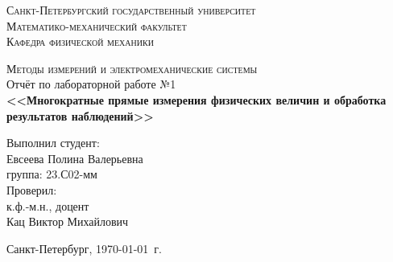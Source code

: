 \begin{titlepage}
\begin{center}
\textsc{Санкт-Петербургский государственный университет\\
Математико-механический факультет\\
Кафедра физической механики\\}

\vfill

\textsc{Методы измерений и электромеханические системы\\[3mm]}
Отчёт по лабораторной работе №1\\[6mm]


\textbf{\large<<Многократные прямые измерения физических величин и обработка результатов наблюдений>>}

\vfill
\end{center}

\hfill
\begin{minipage}{.5\textwidth}
Выполнил студент:\\[2mm] 
Евсеева Полина Валерьевна\\
группа: 23.С02-мм\\[5mm]

Проверил:\\[2mm] 
к.ф.-м.н., доцент\\
Кац Виктор Михайлович
\end{minipage}%
\vfill
\begin{center}
 Санкт-Петербург, \yeardate\today\ г.
\end{center}
\end{titlepage}
